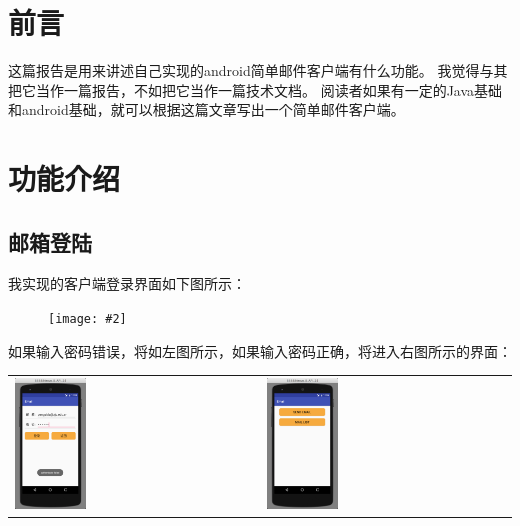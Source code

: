 \documentclass[a4paper,left=2.5cm,right=2.5cm,11pt]{article}
\newcommand{\sizedfic}[2]{\begin{figure}[H]
		\center
		\texttt{[image: \#2]}
	\end{figure}}
\begin{document}
\tableofcontents

\clearpage

\section{前言}
	这篇报告是用来讲述自己实现的android简单邮件客户端有什么功能。
	我觉得与其把它当作一篇报告，不如把它当作一篇技术文档。
	阅读者如果有一定的Java基础和android基础，就可以根据这篇文章写出一个简单邮件客户端。

\section{功能介绍}
\subsection{邮箱登陆}
	我实现的客户端登录界面如下图所示：
	\sizedfic{0.4}{1.png}

\clearpage

	如果输入密码错误，将如左图所示，如果输入密码正确，将进入右图所示的界面：
	\begin{longtable}{p{}p{}}
	\includegraphics[width=0.3\textwidth]{2.png} &
	\includegraphics[width=0.3\textwidth]{3.png} \\
	\end{longtable}
\end{document}
